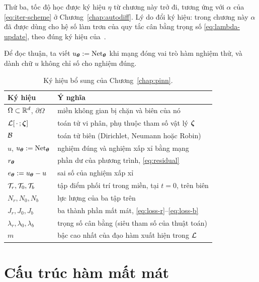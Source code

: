 Thứ ba, tốc độ học được ký hiệu $\eta$ từ chương này trở đi, tương ứng với
$\alpha$ của \eqref{eq:iter-scheme} ở Chương~\ref{chap:autodiff}. Lý do đổi ký
hiệu: trong chương này $\alpha$ đã được dùng cho hệ số làm trơn của quy tắc cân
bằng trọng số \eqref{eq:lambda-update}, theo đúng ký hiệu của~\cite{wang2021}.

Để đọc thuận, ta viết $u_{\bm{\theta}} := \operatorname{Net}_{\bm{\theta}}$ khi mạng đóng vai trò hàm
nghiệm thử, và dành chữ $u$ không chỉ số cho nghiệm đúng.
 
\begin{table}[htbp]
\centering
\caption{Ký hiệu bổ sung của Chương~\ref{chap:pinn}.}
\label{tab:ky-hieu-4}
\small
\begin{tabular}{@{}l p{9.2cm}@{}}
\toprule
\textbf{Ký hiệu} & \textbf{Ý nghĩa} \\
\midrule
$\Omega \subset \mathbb{R}^{d}$, $\partial\Omega$ & miền không gian bị chặn và biên của
  nó \\
$\mathcal{L}[\,\cdot\,;\bm{\zeta}]$ & toán tử vi phân, phụ thuộc tham số vật lý $\bm{\zeta}$ \\
$\mathcal{B}$ & toán tử biên (Dirichlet, Neumann hoặc Robin) \\
$u$, $u_{\bm{\theta}} := \operatorname{Net}_{\bm{\theta}}$ & nghiệm đúng và nghiệm xấp xỉ bằng mạng \\
$r_{\bm{\theta}}$ & phần dư của phương trình, \eqref{eq:residual} \\
$e_{\bm{\theta}} := u_{\bm{\theta}} - u$ & sai số của nghiệm xấp xỉ \\
$\mathcal{T}_r, \mathcal{T}_0, \mathcal{T}_b$ & tập điểm phối trí trong miền, tại $t=0$, trên biên \\
$N_r, N_0, N_b$ & lực lượng của ba tập trên \\
$J_r, J_0, J_b$ & ba thành phần mất mát, \eqref{eq:loss-r}--\eqref{eq:loss-b} \\
$\lambda_r,\lambda_0,\lambda_b$ & trọng số cân bằng (siêu tham số của thuật
  toán) \\
$m$ & bậc cao nhất của đạo hàm xuất hiện trong $\mathcal{L}$ \\
\bottomrule
\end{tabular}
\end{table}
 
\section{Cấu trúc hàm mất mát}
\label{sec:cau-truc-loss}
 
